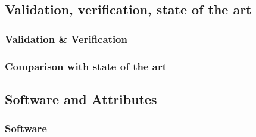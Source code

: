 \documentclass[a4paper,12pt]{article}
\newif\ifshowinstructions
\newcommand{\instructions}[1]{\ifshowinstructions {\fontsize{10}{11}\selectfont #1} \fi}
\begin{document}
\subsection{Validation, verification, state of the art \instructions{(1 page)}}
\label{sec:methods}

\instructions{\it

  Please describe the validity of the simulations and predictions made with this proposal.
  In case you provide references to relevant publications please include here also the key relevant results.
  Please address issues of reproducibility and highlight the predictive capabilities of your simulations.

}


\subsubsection{Validation \& Verification }

\instructions{\it

  Please summarize the validation of your model against experiments or other established reference data.
  Please also provide how the numerical consistency and stability of your computational method has been verified or provide evidence of existing verifications.
  
}

\subsubsection{Comparison with state of the art}
\label{sec:stateoftheart}
\instructions{\it

  Place the project in the context of competing work.
  Explain the relative advantages AND drawbacks of your approach.

}

\subsection{Software and Attributes \instructions{(1 pages)}}

\instructions{\it

  (Please see also Examples of Performance Reporting in Section 2.6.2.1).
  Describe the software that will be used including a discussion of the state of the art in the field.
  The description should mention:

}


\subsubsection{Software}
\end{document}
